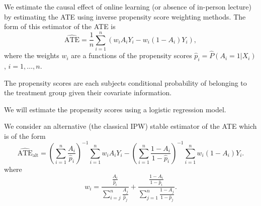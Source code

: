 \documentclass[
  ignorenonframetext,
]{beamer}
\begin{document}
\begin{frame}{}
\protect\hypertarget{section-12}{}
We estimate the causal effect of online learning (or absence of
in-person lecture) by estimating the ATE using inverse propensity score
weighting methods. The form of this estimator of the ATE is \[
 \widehat{\text{ATE}} = \frac{1}{n}\sum_{i=1}^n \left(w_iA_iY_i - w_i(1-A_i)Y_i\right),
\] where the weights \(w_i\) are a functions of the propensity scores
\(\hat{p}_i = \widehat{P}(A_i = 1|X_i)\), \(i = 1,\ldots,n\).

\vspace{12pt}

The propensity scores are each subjects conditional probability of
belonging to the treatment group given their covariate information.

\vspace{12pt}

We will estimate the propensity scores using a logistic regression
model.
\end{frame}

\begin{frame}{}
\protect\hypertarget{section-13}{}
We consider an alternative (the classical IPW) stable estimator of the
ATE which is of the form \[
 \widehat{\text{ATE}}_{\text{alt}} = 
   \left(\sum_{i=1}^n\frac{A_i}{\hat{p}_i}\right)^{-1}\sum_{i=1}^nw_iA_iY_i - 
   \left(\sum_{i=1}^n\frac{1-A_i}{1-\hat{p}_i}\right)^{-1}\sum_{i=1}^nw_i(1-A_i)Y_i.
\] where \[
  w_i = \frac{\frac{A_i}{\hat{p}_i}}{\sum_{i=j}^n\frac{A_j}{\hat{p}_j}} + \frac{\frac{1-A_i}{1 -\hat{p}_i}}{\sum_{j=1}^n\frac{1-A_j}{1-\hat{p}_j}}.
\]
\end{frame}
\end{document}
